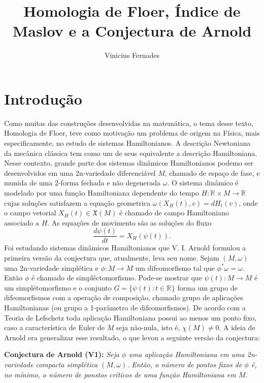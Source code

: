 \documentclass[12pt]{book}
\newcommand{\campohamiltoniano}[1]{X_{H}(#1)}
\newcommand{\campohamiltonianoabrev}{X_{H}}
\newcommand{\campossuaves}[1]{\mathfrak{X}(#1)}
\newcommand{\derivada}[2]{\frac{d #1}{d #2}}
\newcommand{\retacartesianovariedade}{\real{} \times M}
\newcommand{\real}[1]{\mathbb{R}^{#1}}
\newcommand{\reta}{\real{}}
\begin{document}
	
	\title{Homologia de Floer, Índice de Maslov e a Conjectura de Arnold}
	
	\author{Vinicius Fernades}
	
	\maketitle
	
	\tableofcontents
	
	\chapter{Introdução}
	Como muitas das construções desenvolvidas na matemática, o tema desse texto, Homologia de Floer, teve como motivação um problema de origem na Física, mais especificamente, no estudo de sistemas Hamiltonianos. A descrição Newtoniana da mecânica clássica tem como um de seus equivalente a descrição Hamiltoniana. Nesse contexto, grande parte dos sistemas dinâmicos Hamiltonianos podemo ser desenvolvidos em uma 2n-variedade diferenciável $M$, chamado de espaço de fase, e munida de uma 2-forma fechada e não degenerada $\omega$. O sistema dinâmico é modelado por uma função Hamiltoniana dependente do tempo $H: \retacartesianovariedade \to \reta$ cujas soluções satisfazem a equação geometrica $\omega(\campohamiltonianoabrev(t), v) = dH_{t}(v)$, onde o campo vetorial $\campohamiltonianoabrev(t) \in \campossuaves{M}$ é chamado de campo Hamiltoniano associado a $H$. As equações de movimento são as soluções do fluxo
	$$
	\derivada{\psi(t)}{t} = \campohamiltoniano{\psi(t)}.
	$$ 
	Foi estudando sistemas dinâmicos Hamiltonianos que V. I. Arnold formulou a primeira versão da conjectura que, atualmente, leva seu nome. Sejam $(M, \omega )$ uma 2n-variedade simplética e $\phi:M \to M$ um difeomorfismo tal que $\phi^{*}\omega = \omega$. Então $\phi$ é chamado de simpléctomorfismo. Pode-se mostrar que $\psi(t):M\to M$ é um simplétomorfismo e o conjunto $G=\{\psi(t): t \in \reta\}$ forma um grupo de difeomorfismos com a operação de composição, chamado grupo de aplicações Hamiltonianas (ou grupo a 1-parâmetro de difeomorfismos). De acordo com a Teoria de Lefschetz toda aplicação Hamiltoniana possui ao menos um ponto fixo, caso a característica de Euler de $M$ seja não-nula, isto é, $\chi(M)\neq 0$. A ideia de Arnold era generalizar esse resultado, o que levou a seguinte versão da conjectura:
	
	\textbf{Conjectura de Arnold (V1):} \textit{Seja $\phi$ uma aplicação Hamiltoniana em uma 2n-variedade compacta simplética $(M, \omega)$. Então, o número de pontos fixos de $\phi$ é, no mínimo, o número de ponstos críticos de uma função Hamiltoniana em $M$.}
	
\end{document}
